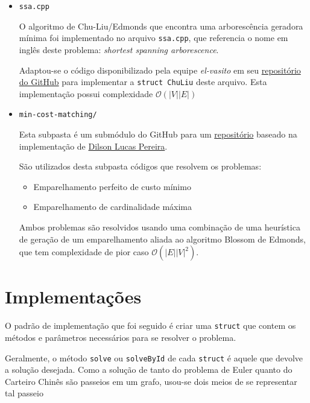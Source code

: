 \begin{itemize}
    \item \texttt{ssa.cpp}

        O algoritmo de Chu-Liu/Edmonds que encontra uma arborescência geradora mínima foi implementado no arquivo \texttt{ssa.cpp}, que referencia o nome em inglês deste problema: \textit{shortest spanning arborescence}.

        Adaptou-se o código disponibilizado pela equipe \textit{el-vasito} em seu \href{https://github.com/mhunicken/icpc-team-notebook-el-vasito}{repositório do GitHub} para implementar a \texttt{struct ChuLiu} deste arquivo.
        Esta implementação possui complexidade $\mathcal{O}(|V||E|)$

    \item \texttt{min-cost-matching/}

        Esta subpasta é um submódulo do GitHub para um \href{https://github.com/gafeol/Minimum-Cost-Perfect-Matching}{repositório} baseado na implementação de \href{https://github.com/dilsonpereira/Minimum-Cost-Perfect-Matching}{Dilson Lucas Pereira}.

        São utilizados desta subpasta códigos que resolvem os problemas:
        \begin{itemize}
            \item Emparelhamento perfeito de custo mínimo 
            \item Emparelhamento de cardinalidade máxima
        \end{itemize}

        Ambos problemas são resolvidos usando uma combinação de uma heurística de geração de um emparelhamento aliada ao algoritmo Blossom de Edmonds, que tem complexidade de pior caso $\mathcal{O}(|E||V|^2)$.

\end{itemize}

\section{Implementações}

O padrão de implementação que foi seguido é criar uma \texttt{struct} que contem os métodos e parâmetros necessários para se resolver o problema.

Geralmente, o método \texttt{solve} ou \texttt{solveById} de cada \texttt{struct} é aquele que devolve a solução desejada.
Como a solução de tanto do problema de Euler quanto do Carteiro Chinês são passeios em um grafo, usou-se dois meios de se representar tal passeio


